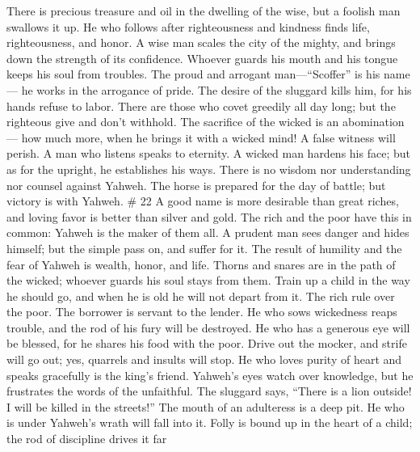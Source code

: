 There is precious treasure and oil in the dwelling of the wise, but a
foolish man swallows it up.  He who follows after
righteousness and kindness finds life, righteousness, and honor.
 A wise man scales the city of the mighty, and brings
down the strength of its confidence.  Whoever guards his
mouth and his tongue keeps his soul from troubles.  The
proud and arrogant man---``Scoffer'' is his name--- he works in the
arrogance of pride.  The desire of the sluggard kills
him, for his hands refuse to labor.  There are those who
covet greedily all day long; but the righteous give and don't withhold.
 The sacrifice of the wicked is an abomination--- how
much more, when he brings it with a wicked mind!  A false
witness will perish. A man who listens speaks to eternity.
 A wicked man hardens his face; but as for the upright,
he establishes his ways.  There is no wisdom nor
understanding nor counsel against Yahweh.  The horse is
prepared for the day of battle; but victory is with Yahweh. \# 22
 A good name is more desirable than great riches, and
loving favor is better than silver and gold.  The rich and
the poor have this in common: Yahweh is the maker of them all.
 A prudent man sees danger and hides himself; but the
simple pass on, and suffer for it.  The result of humility
and the fear of Yahweh is wealth, honor, and life.  Thorns
and snares are in the path of the wicked; whoever guards his soul stays
from them.  Train up a child in the way he should go, and
when he is old he will not depart from it.  The rich rule
over the poor. The borrower is servant to the lender.  He
who sows wickedness reaps trouble, and the rod of his fury will be
destroyed.  He who has a generous eye will be blessed, for
he shares his food with the poor.  Drive out the mocker,
and strife will go out; yes, quarrels and insults will stop.
 He who loves purity of heart and speaks gracefully is
the king's friend.  Yahweh's eyes watch over knowledge,
but he frustrates the words of the unfaithful.  The
sluggard says, ``There is a lion outside! I will be killed in the
streets!''  The mouth of an adulteress is a deep pit. He
who is under Yahweh's wrath will fall into it.  Folly is
bound up in the heart of a child; the rod of discipline drives it far
